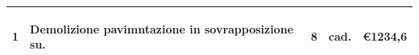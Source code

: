 \documentclass[a4paper]{article}
\begin{document}
\begin{tabular}{ | L{10mm} |  L{86mm} | L{12mm} | L{12mm} | L{16mm} | }
                    \vspace{2.5mm}
                    \begin{spacing}{0}
                      1
                    \end{spacing} &
                    \vspace{2.5mm}
                    \begin{spacing}{0}
                    Demolizione pavimntazione in sovrapposizione su.
                    \end{spacing} &
                    \vspace{2.5mm}
                    \begin{spacing}{0}
                      8
                    \end{spacing} &
                    \vspace{2.5mm}
                    \begin{spacing}{0}
                      cad.
                    \end{spacing} &
                    \vspace{2.5mm}
                    \begin{spacing}{0}
                      \euro\hfill 1234,6
                    \end{spacing} \\
                    \hline



\end{tabular}
\end{document}

